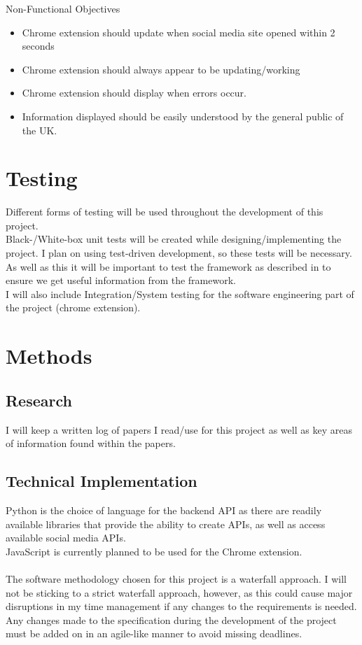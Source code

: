 \documentclass[a4paper,fleqn,10pt]{article}
\begin{document}
Non-Functional Objectives
\begin{itemize}
    \item Chrome extension should update when social media site opened within 2 seconds
    \item Chrome extension should always appear to be updating/working
    \item Chrome extension should display when errors occur.
    \item Information displayed should be easily understood by the general public of the UK.
\end{itemize}

\section{Testing}
\label{sec:testing}
Different forms of testing will be used throughout the development of this project.\\
Black-/White-box unit tests will be created while designing/implementing the project. I plan on using test-driven development,
so these tests will be necessary.\\
As well as this it will be important to test the framework as described in  to ensure we get useful
information from the framework.\\
I will also include Integration/System testing for the software engineering part of the project (chrome extension).

\section{Methods}
\label{sec:methods}

\subsection{Research}
I will keep a written log of papers I read/use for this project as well as key areas of information found within the papers.\\

\subsection{Technical Implementation}
Python is the choice of language for the backend API as there are readily available libraries that provide the ability to
create APIs, as well as access available social media APIs.\\
JavaScript is currently planned to be used for the Chrome extension.\\\\
The software methodology chosen for this project is a waterfall approach. I will not be sticking to a strict waterfall approach, however,
as this could cause major disruptions in my time management if any changes to the requirements is needed. Any changes made to the
specification during the development of the project must be added on in an agile-like manner to avoid missing deadlines.
\end{document}

